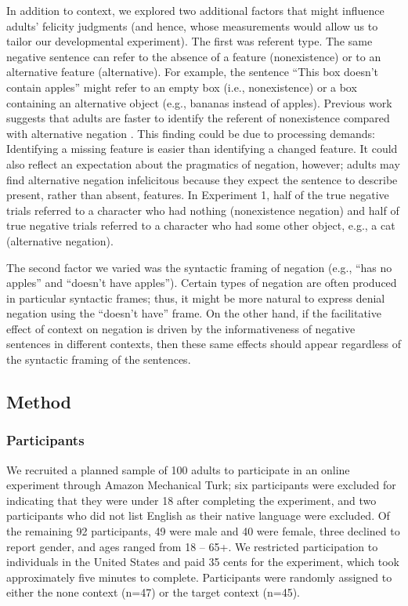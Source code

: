 \documentclass[man, noapacite]{apa2}
\begin{document}
In addition to context, we explored two additional factors that might influence adults' felicity judgments (and hence, whose measurements would allow us to tailor our developmental experiment). The first was referent type. The same negative sentence can refer to the absence of a feature (nonexistence) or to an alternative feature (alternative). For example, the sentence ``This box doesn't contain apples'' might refer to an empty box (i.e., nonexistence) or a box containing an alternative object (e.g., bananas instead of apples). Previous work suggests that adults are faster to identify the referent of nonexistence compared with alternative negation \cite{nordmeyer2013, nordmeyer2014b}. This finding could be due to processing demands: Identifying a missing feature is easier than identifying a changed feature. It could also reflect an expectation about the pragmatics of negation, however; adults may find alternative negation infelicitous because they expect the sentence to describe present, rather than absent, features. In Experiment 1, half of the true negative trials referred to a character who had nothing (nonexistence negation) and half of true negative trials referred to a character who had some other object, e.g., a cat (alternative negation).

The second factor we varied was the syntactic framing of negation (e.g., ``has no apples'' and ``doesn't have apples''). Certain types of negation are often produced in particular syntactic frames; thus, it might be more natural to express denial negation using the ``doesn't have'' frame. On the other hand, if the facilitative effect of context on negation is driven by the informativeness of negative sentences in different contexts, then these same effects should appear regardless of the syntactic framing of the sentences.

\subsection{Method}

\subsubsection{Participants}

We recruited a planned sample of 100 adults to participate in an online experiment through Amazon Mechanical Turk; six participants were excluded for indicating that they were under 18 after completing the experiment, and two participants who did not list English as their native language were excluded. Of the remaining 92 participants, 49 were male and 40 were female, three declined to report gender, and ages ranged from 18 -- 65+. We restricted participation to individuals in the United States and paid 35 cents for the experiment, which took approximately five minutes to complete. Participants were randomly assigned to either the none context (n=47) or the target context (n=45).
\end{document}
